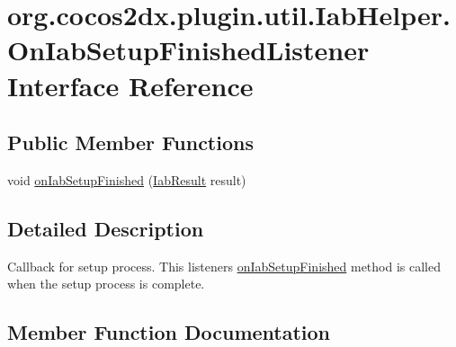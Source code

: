\hypertarget{interfaceorg_1_1cocos2dx_1_1plugin_1_1util_1_1IabHelper_1_1OnIabSetupFinishedListener}{}\section{org.\+cocos2dx.\+plugin.\+util.\+Iab\+Helper.\+On\+Iab\+Setup\+Finished\+Listener Interface Reference}
\label{interfaceorg_1_1cocos2dx_1_1plugin_1_1util_1_1IabHelper_1_1OnIabSetupFinishedListener}
\subsection*{Public Member Functions}
\begin{DoxyCompactItemize}
\item 
void \hyperlink{interfaceorg_1_1cocos2dx_1_1plugin_1_1util_1_1IabHelper_1_1OnIabSetupFinishedListener_a652633cf75129a8c4bdc4654ef72cf8c}{on\+Iab\+Setup\+Finished} (\hyperlink{classorg_1_1cocos2dx_1_1plugin_1_1util_1_1IabResult}{Iab\+Result} result)
\end{DoxyCompactItemize}


\subsection{Detailed Description}
Callback for setup process. This listener\textquotesingle{}s \hyperlink{interfaceorg_1_1cocos2dx_1_1plugin_1_1util_1_1IabHelper_1_1OnIabSetupFinishedListener_a652633cf75129a8c4bdc4654ef72cf8c}{on\+Iab\+Setup\+Finished} method is called when the setup process is complete. 

\subsection{Member Function Documentation}
\mbox{\label{interfaceorg_1_1cocos2dx_1_1plugin_1_1util_1_1IabHelper_1_1OnIabSetupFinishedListener_a652633cf75129a8c4bdc4654ef72cf8c}} 
